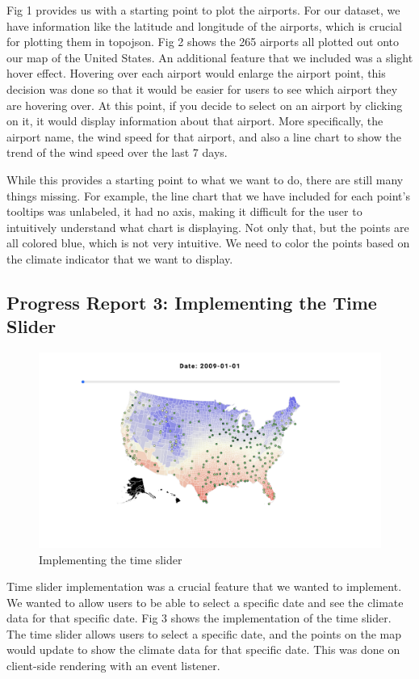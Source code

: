 \documentclass[9pt,twocolumn,twoside]{opticajnl}
\begin{document}
Fig 1 provides us with a starting point to plot the airports. For our dataset, we have information like the latitude and longitude of the airports, which is crucial for plotting them in topojson. Fig 2 shows the 265 airports all plotted out onto our map of the United States. An additional feature that we included was a slight hover effect. Hovering over each airport would enlarge the airport point, this decision was done so that it would be easier for users to see which airport they are hovering over. At this point, if you decide to select on an airport by clicking on it, it would display information about that airport. More specifically, the airport name, the wind speed for that airport, and also a line chart to show the trend of the wind speed over the last 7 days.

While this provides a starting point to what we want to do, there are still many things missing. For example, the line chart that we have included for each point's tooltips was unlabeled, it had no axis, making it difficult for the user to intuitively understand what chart is displaying. Not only that, but the points are all colored blue, which is not very intuitive. We need to color the points based on the climate indicator that we want to display.

\subsection {Progress Report 3: Implementing the Time Slider}

\begin{figure}
    \centering
    \includegraphics[scale=0.10]{images/img3.png}
    \caption{Implementing the time slider}
\end{figure}

Time slider implementation was a crucial feature that we wanted to implement. We wanted to allow users to be able to select a specific date and see the climate data for that specific date. Fig 3 shows the implementation of the time slider. The time slider allows users to select a specific date, and the points on the map would update to show the climate data for that specific date. This was done on client-side rendering with an event listener.
\end{document}
